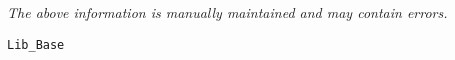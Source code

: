 \label{pkg:lib\_base}

{\tiny \it The above information is manually maintained and may contain errors.}
\begin{verbatim}
Lib_Base
\end{verbatim}
